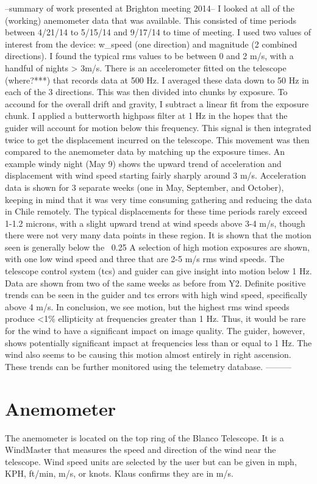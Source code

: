 \documentclass{article}
\begin{document}
--summary of work presented at Brighton meeting 2014--
I looked at all of the (working) anemometer data that was available. This consisted of time periods between 4/21/14 to 5/15/14 and 9/17/14 to time of meeting. 
I used two values of interest from the device: w_speed (one direction) and magnitude (2 combined directions). I found the typical rms values to be between 0 and 2 m/s, with a handful of nights > 3m/s. 
There is an accelerometer fitted on the telescope (where?***) that records data at 500 Hz. I averaged these data down to 50 Hz in each of the 3 directions. This was then divided into chunks by exposure. To accound for the overall drift and gravity, I subtract a linear fit from the exposure chunk. I applied a butterworth highpass filter at 1 Hz in the hopes that the guider will account for motion below this frequency. This signal is then integrated twice to get the displacement incurred on the telescope. This movement was then compared to the anemometer data by matching up the exposure times. 	
	An example windy night (May 9) shows the upward trend of acceleration and displacement with wind speed starting fairly sharply around 3 m/s. 
	Acceleration data is shown for 3 separate weeks (one in May, September, and October), keeping in mind that it was very time consuming gathering and reducing the data in Chile remotely. The typical displacements for these time periods rarely exceed 1-1.2 microns, with a slight upward trend at wind speeds above 3-4 m/s, though there were not very many data points in these region. It is shown that the motion seen is generally below the ~0.25%
	A selection of high motion exposures are shown, with one low wind speed and three that are 2-5 m/s rms wind speeds. 
	The telescope control system (tcs) and guider can give insight into motion below 1 Hz. Data are shown from two of the same weeks as before from Y2. Definite positive trends can be seen in the guider and tcs errors with high wind speed, specifically above 4 m/s. 
	In conclusion, we see motion, but the highest rms wind speeds produce <1\% ellipticity at frequencies greater than 1 Hz. Thus, it would be rare for the wind to have a significant impact on image quality. The guider, however, shows potentially significant impact at frequencies less than or equal to 1 Hz. The wind also seems to be causing this motion almost entirely in right ascension. These trends can be further
 monitored using the telemetry database. 
---------

\section{Anemometer}
The anemometer is located on the top ring of the Blanco Telescope. It is a WindMaster that measures the speed and direction of the wind near the telescope.
Wind speed units are selected by the user but can be given in mph, KPH, ft/min, m/s, or knots. Klaus confirms they are in m/s.
\end{document}
